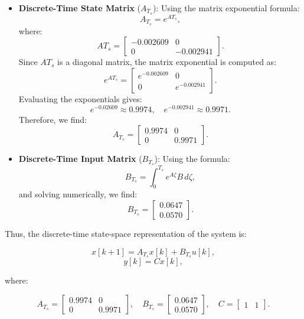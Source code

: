 \begin{itemize}
    \item \textbf{Discrete-Time State Matrix} (\(A_{T_s}\)): 
   Using the matrix exponential formula:
   \[
   A_{T_s} = e^{A T_s},
   \]
   where:
  \[
   A T_s = 
   \begin{bmatrix}
   -0.002609 & 0 \\
   0 & -0.002941
   \end{bmatrix}.
   \]
   Since \( A T_s \) is a diagonal matrix, the matrix exponential is computed as:
   \[
   e^{A T_s} = 
   \begin{bmatrix}
   e^{-0.002609} & 0 \\
   0 & e^{-0.002941}
   \end{bmatrix}.
   \]
   Evaluating the exponentials gives:
   \[
   e^{-0.02609} \approx 0.9974, \quad e^{-0.002941} \approx 0.9971.
   \]
   Therefore, we find:
   \[
    A_{T_s} = 
    \begin{bmatrix}
    0.9974 & 0 \\
    0 & 0.9971
    \end{bmatrix}.
    \]
\end{itemize}

\begin{itemize} 
    \item \textbf{Discrete-Time Input Matrix} (\(B_{T_s}\)): 
   Using the formula:
   \[
   B_{T_s} = \int_0^{T_s} e^{A \zeta} B \, d\zeta,
   \]
   and solving numerically, we find:
\[
   B_{T_s} = 
   \begin{bmatrix}
    0.0647 \\
    0.0570
   \end{bmatrix}.
   \]
\end{itemize}

Thus, the discrete-time state-space representation of the system is:

\[
x[k+1] = A_{T_s} x[k] + B_{T_s} u[k],
\]
\[
y[k] = C x[k],
\]

where:

\[
    A_{T_s} = 
    \begin{bmatrix}
    0.9974 & 0 \\
    0 & 0.9971
    \end{bmatrix}, \quad
    B_{T_s} = 
    \begin{bmatrix}
    0.0647 \\
    0.0570
    \end{bmatrix}, \quad
    C = 
    \begin{bmatrix}
    1 & 1
    \end{bmatrix}.
\]

